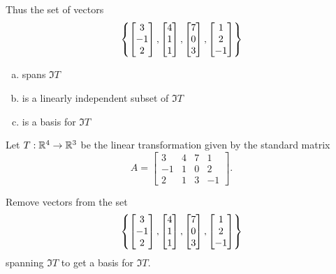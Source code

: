 \begin{applicationActivities}
\begin{activity}{5}
Thus the set of vectors
\[
  \left\{
    \begin{bmatrix}3\\-1\\2\end{bmatrix},
    \begin{bmatrix}4\\1\\1\end{bmatrix},
    \begin{bmatrix}7\\0\\3\end{bmatrix},
    \begin{bmatrix}1\\2\\-1\end{bmatrix}
  \right\}
\]
\begin{enumerate}[a)]
\item spans \(\Im T\)
\item is a linearly independent subset of \(\Im T\)
\item is a basis for \(\Im T\)
\end{enumerate}
\end{activity}


\begin{activity}{10}
Let $T: \mathbb{R}^4 \rightarrow \mathbb{R}^3$ be the linear transformation given by the
standard matrix
\[
  A
    =
  \begin{bmatrix} 3 & 4 & 7 & 1\\ -1 & 1 & 0 & 2 \\ 2 & 1 & 3 & -1 \end{bmatrix}
.\]

Remove vectors from the set
\[
  \left\{
    \begin{bmatrix}3\\-1\\2\end{bmatrix},
    \begin{bmatrix}4\\1\\1\end{bmatrix},
    \begin{bmatrix}7\\0\\3\end{bmatrix},
    \begin{bmatrix}1\\2\\-1\end{bmatrix}
  \right\}
\]
spanning \(\Im T\) to get a basis for \(\Im T\).
\end{activity}


\end{applicationActivities}
